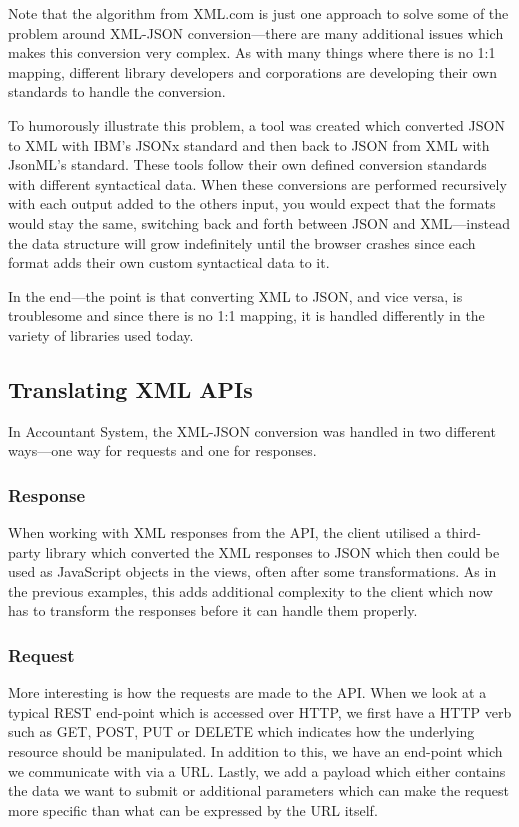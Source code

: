 \documentclass{cslthse-msc}
\begin{document}
Note that the algorithm from XML.com is just one approach to solve some of the problem around XML-JSON conversion---there are many additional issues which makes this conversion very complex. As with many things where there is no 1:1 mapping, different library developers and corporations are developing their own standards to handle the conversion.

To humorously illustrate this problem, a tool was created\cite{jsonx_jsonml} which converted JSON to XML with IBM's JSONx\cite{jsonx} standard and then back to JSON from XML with JsonML's\cite{jsonml} standard. These tools follow their own defined conversion standards with different syntactical data. When these conversions are performed recursively with each output added to the others input, you would expect that the formats would stay the same, switching back and forth between JSON and XML---instead the data structure will grow indefinitely until the browser crashes since each format adds their own custom syntactical data to it.

In the end---the point is that converting XML to JSON, and vice versa, is troublesome and since there is no 1:1 mapping, it is handled differently in the variety of libraries used today.

\subsection{Translating XML APIs}
In Accountant System, the XML-JSON conversion was handled in two different ways---one way for requests and one for responses.

\subsubsection{Response}

When working with XML responses from the API, the client utilised a third-party library which converted the XML responses to JSON which then could be used as JavaScript objects in the views, often after some transformations. As in the previous examples, this adds additional complexity to the client which now has to transform the responses before it can handle them properly.

\subsubsection{Request}
More interesting is how the requests are made to the API. When we look at a typical REST end-point which is accessed over HTTP, we first have a HTTP verb such as GET, POST, PUT or DELETE which indicates how the underlying resource should be manipulated. In addition to this, we have an end-point which we communicate with via a URL. Lastly, we add a payload which either contains the data we want to submit or additional parameters which can make the request more specific than what can be expressed by the URL itself.
\end{document}
